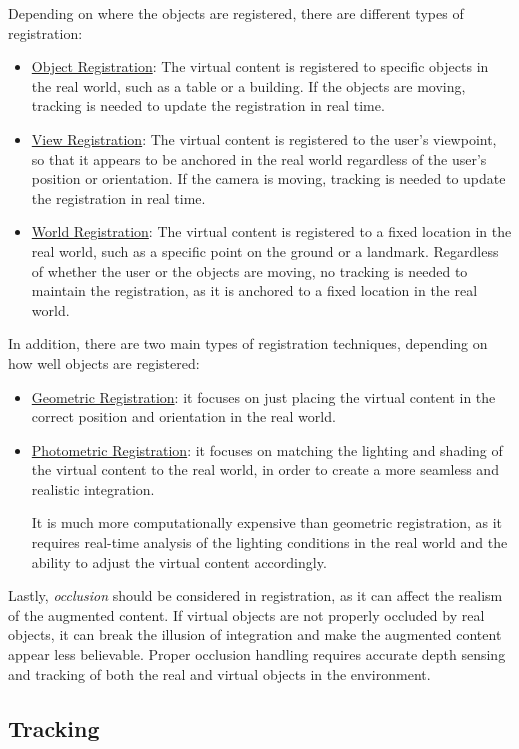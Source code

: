 Depending on where the objects are registered, there are different types of registration:
\begin{itemize}
    \item \ul{Object Registration}: The virtual content is registered to specific objects in the real world, such as a table or a building. If the objects are moving, tracking is needed to update the registration in real time.
    \item \ul{View Registration}: The virtual content is registered to the user's viewpoint, so that it appears to be anchored in the real world regardless of the user's position or orientation. If the camera is moving, tracking is needed to update the registration in real time.
    \item \ul{World Registration}: The virtual content is registered to a fixed location in the real world, such as a specific point on the ground or a landmark. Regardless of whether the user or the objects are moving, no tracking is needed to maintain the registration, as it is anchored to a fixed location in the real world.
\end{itemize}

In addition, there are two main types of registration techniques, depending on how well objects are registered:
\begin{itemize}
    \item \ul{Geometric Registration}: it focuses on just placing the virtual content in the correct position and orientation in the real world.
    \item \ul{Photometric Registration}: it focuses on matching the lighting and shading of the virtual content to the real world, in order to create a more seamless and realistic integration.
    
    It is much more computationally expensive than geometric registration, as it requires real-time analysis of the lighting conditions in the real world and the ability to adjust the virtual content accordingly.
\end{itemize}

Lastly, \emph{occlusion} should be considered in registration, as it can affect the realism of the augmented content. If virtual objects are not properly occluded by real objects, it can break the illusion of integration and make the augmented content appear less believable. Proper occlusion handling requires accurate depth sensing and tracking of both the real and virtual objects in the environment.

\subsection{Tracking}

